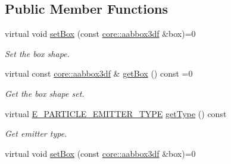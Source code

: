 \subsection*{Public Member Functions}
\begin{DoxyCompactItemize}
\item 
\mbox{\label{classirr_1_1scene_1_1IParticleBoxEmitter_af3833d2cc46d1a704f5dd6f9c12e40a8}} 
virtual void \hyperlink{classirr_1_1scene_1_1IParticleBoxEmitter_af3833d2cc46d1a704f5dd6f9c12e40a8}{set\+Box} (const \hyperlink{namespaceirr_1_1core_a60f4b4c744aba55f10530d503c6ecb04}{core\+::aabbox3df} \&box)=0
\begin{DoxyCompactList}\small\item\em Set the box shape. \end{DoxyCompactList}\item 
\mbox{\label{classirr_1_1scene_1_1IParticleBoxEmitter_a06eaf3f090994cd4d5a8d52a63652504}} 
virtual const \hyperlink{namespaceirr_1_1core_a60f4b4c744aba55f10530d503c6ecb04}{core\+::aabbox3df} \& \hyperlink{classirr_1_1scene_1_1IParticleBoxEmitter_a06eaf3f090994cd4d5a8d52a63652504}{get\+Box} () const =0
\begin{DoxyCompactList}\small\item\em Get the box shape set. \end{DoxyCompactList}\item 
\mbox{\label{classirr_1_1scene_1_1IParticleBoxEmitter_a7072d42775bc75b9d5a08f26d39a27a0}} 
virtual \hyperlink{namespaceirr_1_1scene_a3e251a881c886884a78adea2e546272b}{E\+\_\+\+P\+A\+R\+T\+I\+C\+L\+E\+\_\+\+E\+M\+I\+T\+T\+E\+R\+\_\+\+T\+Y\+PE} \hyperlink{classirr_1_1scene_1_1IParticleBoxEmitter_a7072d42775bc75b9d5a08f26d39a27a0}{get\+Type} () const
\begin{DoxyCompactList}\small\item\em Get emitter type. \end{DoxyCompactList}\item 
\mbox{\label{classirr_1_1scene_1_1IParticleBoxEmitter_af3833d2cc46d1a704f5dd6f9c12e40a8}} 
virtual void \hyperlink{classirr_1_1scene_1_1IParticleBoxEmitter_af3833d2cc46d1a704f5dd6f9c12e40a8}{set\+Box} (const \hyperlink{namespaceirr_1_1core_a60f4b4c744aba55f10530d503c6ecb04}{core\+::aabbox3df} \&box)=0

\end{DoxyCompactItemize}
